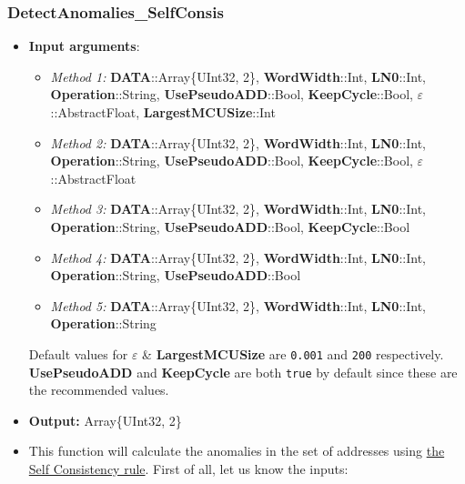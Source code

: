 \subsubsection*{DetectAnomalies\_SelfConsis}\label{Fun:DetectAnomaliesSelfConsis}
\begin{itemize}
	\item \textbf{Input arguments}:
	\begin{itemize}
		\item  \textit{Method 1: }\textbf{DATA}::Array\{UInt32, 2\}, 
		\textbf{WordWidth}::Int,
		\textbf{LN0}::Int,
		\textbf{Operation}::String,
		\textbf{UsePseudoADD}::Bool,
		\textbf{KeepCycle}::Bool,
		\textbf{\(\varepsilon\)}::AbstractFloat,
		\textbf{LargestMCUSize}::Int
		\item  \textit{Method 2: }\textbf{DATA}::Array\{UInt32, 2\}, 
		\textbf{WordWidth}::Int,
		\textbf{LN0}::Int,
		\textbf{Operation}::String,
		\textbf{UsePseudoADD}::Bool,
		\textbf{KeepCycle}::Bool,
		\textbf{\(\varepsilon\)}::AbstractFloat
		\item  \textit{Method 3: }\textbf{DATA}::Array\{UInt32, 2\}, 
		\textbf{WordWidth}::Int,
		\textbf{LN0}::Int,
		\textbf{Operation}::String,
		\textbf{UsePseudoADD}::Bool,
		\textbf{KeepCycle}::Bool
		\item  \textit{Method 4: }\textbf{DATA}::Array\{UInt32, 2\}, 
		\textbf{WordWidth}::Int,
		\textbf{LN0}::Int,
		\textbf{Operation}::String,
		\textbf{UsePseudoADD}::Bool
		\item  \textit{Method 5: }\textbf{DATA}::Array\{UInt32, 2\}, 
		\textbf{WordWidth}::Int,
		\textbf{LN0}::Int,
		\textbf{Operation}::String
	\end{itemize}

	Default values for \textbf{\(\varepsilon\)} \& 	\textbf{LargestMCUSize} are \texttt{0.001} and \texttt{200} respectively. \textbf{UsePseudoADD} and \textbf{KeepCycle} are both \texttt{true} by default since these are the recommended values.
	\item \textbf{Output: } Array\{UInt32, 2\}	
	\item This function will calculate the anomalies in the set of addresses using \hyperref[Subsec:SelfConsistencyRule]{the Self Consistency rule}. 
	 First of all, let us know the inputs:
	 \begin{itemize}
	

\end{itemize}
\end{itemize}
